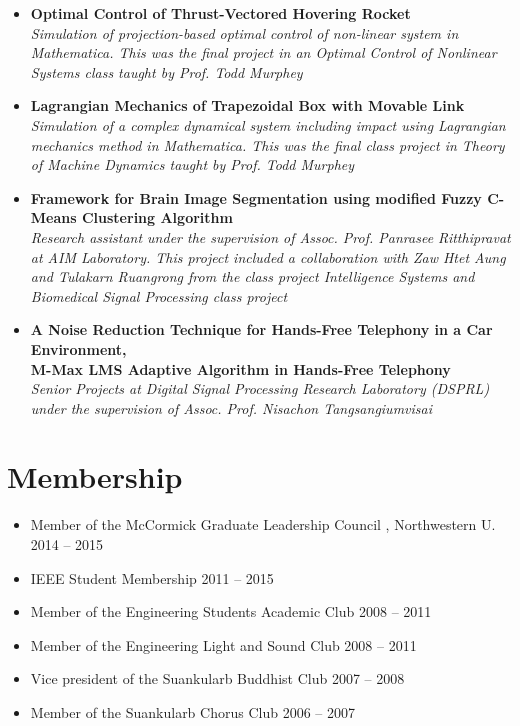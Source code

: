 \documentclass[margin,line]{res}
\begin{document}
\begin{resume}
\begin{itemize}[leftmargin=0cm, label={}]
\item {\bf Optimal Control of Thrust-Vectored Hovering Rocket}\\
{\em Simulation of projection-based optimal control of non-linear system in Mathematica. This was the final project in an  Optimal Control of Nonlinear Systems class taught by Prof. Todd Murphey}

\item {\bf Lagrangian Mechanics of Trapezoidal Box with Movable Link}\\
{\em Simulation of a complex dynamical system including impact using Lagrangian mechanics method in Mathematica. This was the final class project in Theory of Machine Dynamics taught by Prof. Todd Murphey }

\item {\bf Framework for Brain Image Segmentation using modified Fuzzy C-Means Clustering Algorithm}\\
{\em Research assistant under the supervision of Assoc. Prof. Panrasee Ritthipravat at AIM Laboratory. This project included a collaboration with Zaw Htet Aung and Tulakarn Ruangrong from the class project Intelligence Systems and Biomedical Signal Processing class project}

\item {\bf A Noise Reduction Technique for Hands-Free Telephony in a Car Environment, } \\
{\bf M-Max LMS Adaptive Algorithm in Hands-Free Telephony}\\
{\em Senior Projects at Digital Signal Processing Research Laboratory (DSPRL) under the supervision of Assoc. Prof. Nisachon Tangsangiumvisai}

\end{itemize}



\section{\sc Membership}
\begin{itemize}[leftmargin=0cm, label={}]
\item Member of the McCormick Graduate Leadership Council	, Northwestern U.	\hfill 2014 -- 2015
\item IEEE Student Membership 										\hfill 2011 -- 2015
\item Member of the Engineering Students Academic Club	 				\hfill 2008 -- 2011
\item Member of the Engineering Light and Sound Club 						\hfill 2008 -- 2011
\item Vice president of the Suankularb Buddhist Club 						\hfill 2007 -- 2008
\item Member of the Suankularb Chorus Club 								\hfill 2006 -- 2007
\end{itemize}


\end{resume}
\end{document}
